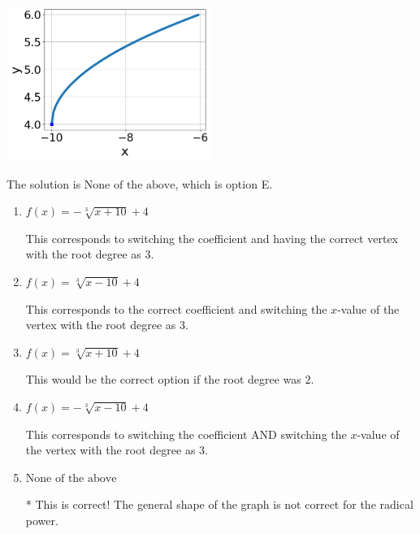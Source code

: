 \documentclass{extbook}[14pt]
\begin{document}
\begin{enumerate}
{\begin{center}
    \includegraphics[width=0.5\textwidth]{../Figures/radicalGraphToEquationA.png}
\end{center}


The solution is \( \text{None of the above} \), which is option E.\begin{enumerate}[label=\Alph*.]
\item \( f(x) = - \sqrt[3]{x + 10} + 4 \)

This corresponds to switching the coefficient and having the correct vertex with the root degree as $3$.
\item \( f(x) = \sqrt[3]{x - 10} + 4 \)

This corresponds to the correct coefficient and switching the $x$-value of the vertex with the root degree as $3$.
\item \( f(x) = \sqrt[3]{x + 10} + 4 \)

This would be the correct option if the root degree was $2$.
\item \( f(x) = - \sqrt[3]{x - 10} + 4 \)

This corresponds to switching the coefficient AND switching the $x$-value of the vertex with the root degree as $3$.
\item \( \text{None of the above} \)

* This is correct! The general shape of the graph is not correct for the radical power.
\end{enumerate}

}
\end{enumerate}
\end{document}
